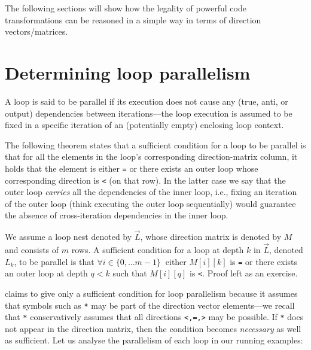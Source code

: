 The following sections will show how the legality of powerful code
transformations can be reasoned in a simple way in terms of direction
vectors/matrices.

\section{Determining loop parallelism}
\label{sec:loop-par}

A loop is said to be parallel if its execution does not cause any
(true, anti, or output) dependencies between iterations---the loop
execution is assumed to be fixed in a specific iteration of an
(potentially empty) enclosing loop context.

The following theorem states that a sufficient condition for a loop to
be parallel is that for all the elements in the loop's corresponding
direction-matrix column, it holds that the element is either
\texttt{=} or there exists an outer loop whose corresponding direction
is \texttt{<} (on that row).  In the latter case we say that the outer
loop \emph{carries} all the dependencies of the inner loop, i.e.,
fixing an iteration of the outer loop (think executing the outer loop
sequentially) would guarantee the absence of cross-iteration
dependencies in the inner loop.

\begin{theorem}\label{Loop-Par}

  We assume a loop nest denoted by $\vec{L}$, whose direction matrix
  is denoted by $M$ and consists of $m$ rows.  A sufficient condition
  for a loop at depth $k$ in $\vec{L}$, denoted $L_k$, to be parallel
  is that $\forall i\in\{0,\ldots m-1\}~$ either $M[i][k]$ is
  \texttt{=} or there exists an outer loop at depth $q<k$ such that
  $M[i][q]$ is \texttt{<}.  Proof left as an exercise.
\end{theorem}

 claims to give only a sufficient condition for loop
parallelism because it assumes that symbols such as \texttt{*} may be
part of the direction vector elements---we recall that \texttt{*}
conservatively assumes that all directions \texttt{<,=,>} may be
possible. If \texttt{*} does not appear in the direction matrix, then
the condition becomes \emph{necessary} as well as sufficient.  Let us
analyse the parallelism of each loop in our running examples:

